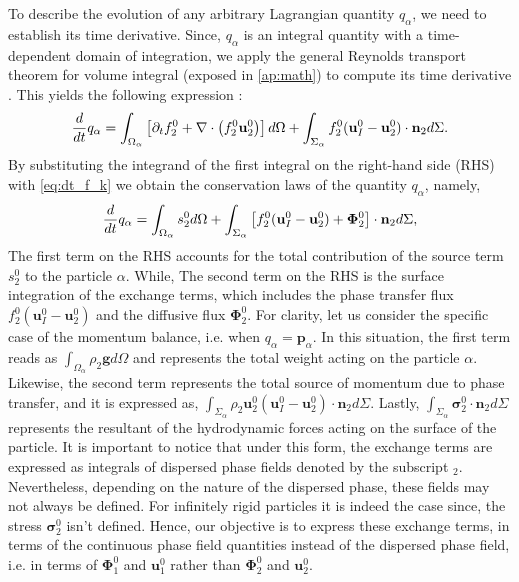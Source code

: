 To describe the evolution of any arbitrary Lagrangian quantity $q_\alpha$, we need to establish its time derivative.
Since, $q_\alpha$ is an integral quantity with a time-dependent domain of integration, we apply the general Reynolds transport theorem for volume integral (exposed in \ref{ap:math}) to compute its time derivative \citep{morel2015mathematical}.
This yields the following expression :
\begin{equation}
    \frac{d}{d t}  q_\alpha
    = \int_{\Omega_\alpha}\left[ \partial_t f_2^0 + \mathbf{\nabla}\cdot\left(f_2^0\textbf{u}_2^0\right) \right]d\Omega\\
    + \int_{\Sigma_\alpha} f_2^0 (\textbf{u}_I^0-\textbf{u}_2^0)\cdot \textbf{n}_2 d\Sigma.
\end{equation}
By substituting the integrand of the first integral on the right-hand side (RHS) with \ref{eq:dt_f_k} we obtain the conservation laws of the quantity $q_\alpha$, namely,  
\begin{equation}
    \frac{d}{d t}  q_\alpha
    = \int_{\Omega_\alpha} s_2^0 d\Omega
    + \int_{\Sigma_\alpha} \left[
        f_2^0 (\textbf{u}_I^0-\textbf{u}_2^0) 
        + \mathbf{\Phi}_2^0 
        \right] \cdot \textbf{n}_2 d\Sigma,
    \label{eq:dt_q_alpha}
\end{equation}
The first term on the RHS accounts for the total contribution of the source term $s_2^0$ to the particle $\alpha$.
While, The second term on the RHS is the surface integration of the exchange terms, which includes the phase transfer flux $f_2^0 (\textbf{u}_I^0-\textbf{u}_2^0)$ and the diffusive flux $\mathbf{\Phi}_2^0$. 
For clarity, let us consider the specific case of the momentum balance, i.e. when $q_\alpha = \textbf{p}_\alpha$.
In this situation, the first term reads as $\int_{\Omega_\alpha} \rho_2\textbf{g} d\Omega$ and represents the total weight acting on the particle $\alpha$. 
Likewise, the second term represents the total source of momentum due to phase transfer, and it is expressed as, $\int_{\Sigma_\alpha} \rho_2 \textbf{u}_2^0 (\textbf{u}_I^0-\textbf{u}_2^0)\cdot\textbf{n}_2 d\Sigma$. 
Lastly, $\int_{\Sigma_\alpha} \bm{\sigma}_2^0\cdot\textbf{n}_2 d\Sigma$ represents the resultant of the hydrodynamic forces acting on the surface of the particle.
It is important to notice that under this form, the exchange terms are expressed as integrals of dispersed phase fields denoted by the subscript $_2$.
Nevertheless, depending on the nature of the dispersed phase, these fields may not always be defined.
For infinitely rigid particles it is indeed the case since, the stress $\bm{\sigma}_2^0$ isn't defined.  
Hence, our objective is to express these exchange terms, in terms of the continuous phase field quantities instead of the dispersed phase field, i.e. in terms of $\mathbf{\Phi}_1^0$ and $\textbf{u}_1^0$ rather than $\mathbf{\Phi}_2^0$ and $\textbf{u}_2^0$. 

